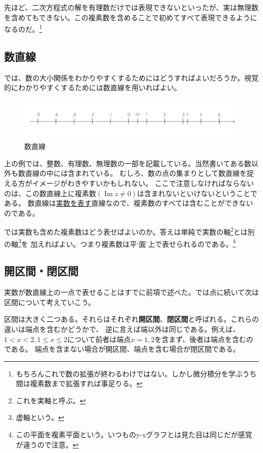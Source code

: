 \documentclass[a4j,dvipdfmx]{jsarticle}
\renewcommand{\Im}{\operatorname{Im}}
\begin{document}
            先ほど、二次方程式の解を有理数だけでは表現できないといったが、実は無理数を含めてもできない。この複素数を含めることで初めてすべて表現できるようになるのだ。\footnote{もちろんこれで数の拡張が終わるわけではない。しかし微分積分を学ぶうち間は複素数まで拡張すれば事足りる。}
        \subsection{数直線}
            では、数の大小関係をわかりやすくするためにはどうすればよいだろうか。視覚的にわかりやすくするためには数直線を用いればよい。
            \begin{figure}[h]
                \centering
                \includegraphics[keepaspectratio,scale=0.5]{img/QuuNote/NumLine_1.png}
                \caption{数直線}
            \end{figure}
            
            上の例では、整数、有理数、無理数の一部を記載している。当然書いてある数以外も数直線の中には含まれている。
            むしろ、数の点の集まりとして数直線を捉える方がイメージがわきやすいかもしれない。
            ここで注意しなければならないのは、この数直線上に複素数$(\Im z\neq 0)$は含まれないといけないということである。
            数直線は\underline{実数を表す}直線なので、複素数のすべては含むことができないのである。

            では実数も含めた複素数はどう表せばよいのか。答えは単純で実数の軸\footnote{これを実軸と呼ぶ。}とは別の軸\footnote{虚軸という。}を
            加えればよい。つまり複素数は平`面'上で表せられるのである。\footnote{この平面を複素平面という。いつものy-xグラフとは見た目は同じだが感覚が違うので注意。}  
            \newpage
        \subsection{開区間・閉区間}
            実数が数直線上の一点で表せることはすでに前項で述べた。では点に続いて次は区間について考えていこう。

            区間は大きく二つある。それらはそれぞれ\textbf{開区間}、\textbf{閉区間}と呼ばれる。これらの違いは端点を含むかどうかで、
            逆に言えば端以外は同じである。例えば、$1<x<2,1\leq x\leq2$について前者は端点$x=1,2$を含まず、後者は端点を含むのである。
            端点を含まない場合が開区間、端点を含む場合が閉区間である。
\end{document}
